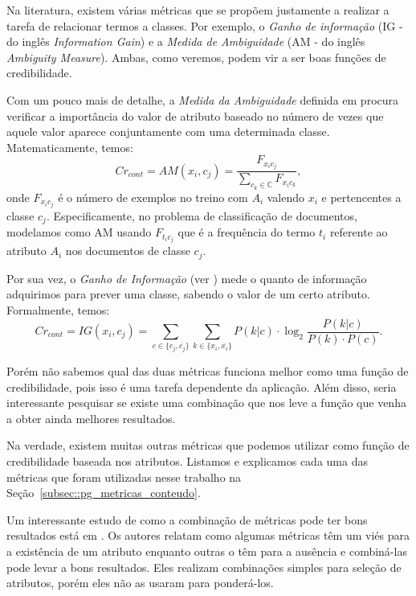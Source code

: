 Na literatura, existem várias métricas que se propõem justamente a realizar a tarefa de relacionar termos a classes. Por exemplo, o \textit{Ganho de informação} (\textsc{IG} - do inglês \textit{Information Gain}) e a \textit{Medida de Ambiguidade} (\textsc{AM} - do inglês \textit{Ambiguity Measure}). Ambas, como veremos, podem vir a ser boas funções de credibilidade. 

Com um pouco mais de detalhe, a \textit{Medida da Ambiguidade} definida em \cite{Mengle08} procura verificar a importância do valor de atributo baseado no número de vezes que aquele valor aparece conjuntamente com uma determinada classe. Matematicamente, temos:
\begin{equation}\label{eqn::classindependence_conteudo_am}
   Cr_{cont} = AM(x_i, c_j) = \frac{ F_{x_{i}c_{j}}}{\sum\limits_{c_k \in \mathbb{C}} F_{x_{i}c_{k}}},
\end{equation}
   onde $F_{x_{i}c_{j}}$ é o número de exemplos no treino com $A_i$ valendo $x_i$ e pertencentes a classe $c_j$. Especificamente, no problema de classificação de documentos, modelamos como \textsc{AM} usando $F_{t_{i}c_{j}}$ que é a frequência do termo $t_i$ referente ao atributo $A_i$ nos documentos de classe $c_j$.

    Por sua vez, o \textit{Ganho de Informação} (ver \cite{Forman03}) mede o quanto de informação adquirimos para prever uma classe, sabendo o valor de um certo atributo. Formalmente, temos:
\begin{equation}\label{eqn::classindependence_conteudo_ig}
   Cr_{cont} = IG(x_i, c_j) = \sum_{c \in \{c_j, \overline{c_j}\}}\sum_{k \in \{x_i, \overline{x_i}\}}P(k|c) \cdot \log_2\frac{P(k|c)}{P(k) \cdot P(c)}.
\end{equation}
 
 
 Porém não sabemos qual das duas métricas funciona melhor como uma função de credibilidade, pois isso é uma tarefa dependente da aplicação.
 Além disso, seria interessante pesquisar se existe uma combinação que nos leve a função que venha a obter ainda melhores resultados. 

Na verdade, existem muitas outras métricas que podemos utilizar como função de credibilidade baseada nos atributos. Listamos e explicamos cada uma das métricas que foram utilizadas nesse trabalho na Seção~\ref{subsec::pg_metricas_conteudo}. 
    
    Um interessante estudo de como a combinação de métricas pode ter bons resultados está em \cite{Tang05}. Os autores relatam como algumas métricas têm um viés para a existência de um atributo enquanto outras o têm para a ausência e combiná-las pode levar a bons resultados. 
    Eles realizam combinações simples para seleção de atributos, porém eles não as usaram para ponderá-los.    

